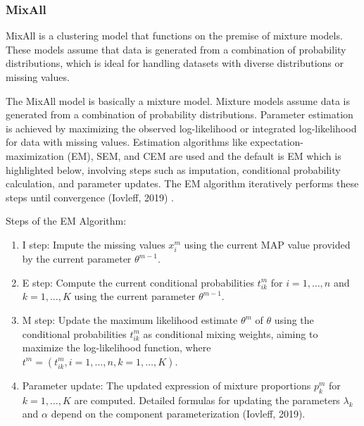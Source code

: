 \documentclass[11pt, a4paper]{article}
\begin{document}
\subsubsection{MixAll}

MixAll is a clustering model that functions on the premise of mixture models. These models assume that data is generated from a combination of probability distributions, which is ideal for handling datasets with diverse distributions or missing values.
\par
The MixAll model is basically a mixture model. Mixture models assume data is generated from a combination of probability distributions. Parameter estimation is achieved by maximizing the observed log-likelihood or integrated log-likelihood for data with missing values. Estimation algorithms like expectation-maximization (EM), SEM, and CEM are used and the default is EM which is highlighted below, involving steps such as imputation, conditional probability calculation, and parameter updates. The EM algorithm iteratively performs these steps until convergence (Iovleff, 2019) .
\par
Steps of the EM Algorithm:
\begin{enumerate}
\item I step: Impute the missing values $x^{m}_{i}$ using the current MAP value provided by the current parameter $\theta^{m-1}$.
\item E step: Compute the current conditional probabilities $t^{m}_{ik}$ for $i = 1, \ldots, n$ and $k = 1, \ldots, K$ using the current parameter $\theta^{m-1}$.
\item M step: Update the maximum likelihood estimate $\theta^{m}$ of $\theta$ using the conditional probabilities $t^{m}_{ik}$ as conditional mixing weights, aiming to maximize the log-likelihood function, where $t^{m} = (t^{m}_{ik}, i = 1, \ldots, n, k = 1, \ldots, K)$.
\item Parameter update: The updated expression of mixture proportions $p^{m}_{k}$ for $k = 1, \ldots, K$ are computed. Detailed formulas for updating the parameters $\lambda_{k}$ and $\alpha$ depend on the component parameterization (Iovleff, 2019).
\end{enumerate}
\end{document}
